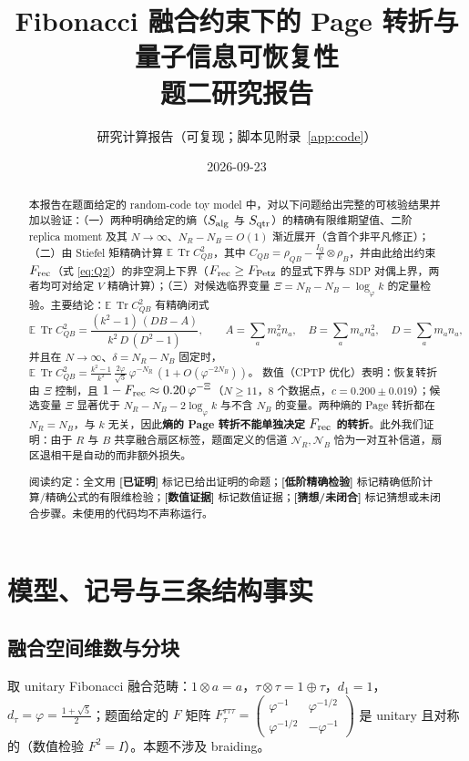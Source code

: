 \documentclass[11pt,a4paper]{ctexart}
\title{\bfseries Fibonacci 融合约束下的 Page 转折与量子信息可恢复性{}\\[4pt] \large 题二研究报告}
\author{研究计算报告（可复现；脚本见附录~\ref{app:code}）}
\date{2026-09-23}
\theoremstyle{definition}
\newcommand{\proved}{\textcolor{green!45!black}{\textbf{[已证明]}}}
\newcommand{\loword}{\textcolor{orange!80!black}{\textbf{[低阶精确检验]}}}
\newcommand{\numeric}{\textcolor{blue!70!black}{\textbf{[数值证据]}}}
\newcommand{\conj}{\textcolor{red!70!black}{\textbf{[猜想/未闭合]}}}
\newcommand{\Tr}{\operatorname{Tr}}
\newcommand{\E}{\mathbb{E}}
\newcommand{\ph}{\varphi}
\newcommand{\Frec}{F_{\rm rec}}
\begin{document}
\maketitle

\begin{abstract}
本报告在题面给定的 random-code toy model 中，对以下问题给出完整的可核验结果并加以验证：（一）两种明确给定的熵（$S_{\rm alg}$ 与 $S_{\rm qtr}$）的精确有限维期望值、二阶 replica moment 及其 $N\to\infty$、$N_R-N_B=O(1)$ 渐近展开（含首个非平凡修正）；（二）由 Stiefel 矩精确计算 $\E\,\Tr C_{QB}^2$，其中 $C_{QB}=\rho_{QB}-\frac{I_Q}{k}\otimes\rho_B$，并由此给出约束 $F_{\rm rec}$（式 \eqref{eq:Q2}）的非空洞上下界（$F_{\rm rec}\ge F_{\rm Petz}$ 的显式下界与 SDP 对偶上界，两者均可对给定 $V$ 精确计算）；（三）对候选临界变量 $\Xi=N_R-N_B-\log_{\ph}k$ 的定量检验。主要结论：$\E\,\Tr C_{QB}^2$ 有精确闭式
\[
\E\,\Tr C_{QB}^2=\frac{(k^2-1)\,(D B-A)}{k^2\,D\,(D^2-1)},\qquad
A=\sum_a m_a^2n_a,\quad B=\sum_a m_an_a^2,\quad D=\sum_a m_an_a,
\]
并且在 $N\to\infty$、$\delta=N_R-N_B$ 固定时，
$\E\,\Tr C_{QB}^2=\frac{k^2-1}{k^2}\,\frac{2\ph}{\sqrt5}\,\ph^{-N_R}\,(1+O(\ph^{-2N_B}))$。
数值（CPTP 优化）表明：恢复转折由 $\Xi$ 控制，且 $1-\Frec\approx 0.20\,\ph^{-\Xi}$（$N\ge11$，8 个数据点，$c=0.200\pm0.019$）；候选变量 $\Xi$ 显著优于 $N_R-N_B-2\log_\ph k$ 与不含 $N_B$ 的变量。两种熵的 Page 转折都在 $N_R=N_B$，与 $k$ 无关，因此\textbf{熵的 Page 转折不能单独决定 $F_{\rm rec}$ 的转折}。此外我们证明：由于 $R$ 与 $B$ 共享融合扇区标签，题面定义的信道 $\mathcal N_R,\mathcal N_B$ 恰为一对互补信道，扇区退相干是自动的而非额外损失。

\medskip
\noindent 阅读约定：全文用 \proved{} 标记已给出证明的命题；\loword{} 标记精确低阶计算/精确公式的有限维检验；\numeric{} 标记数值证据；\conj{} 标记猜想或未闭合步骤。未使用的代码均不声称运行。
\end{abstract}

\tableofcontents

\section{模型、记号与三条结构事实}
\label{sec:setup}

\subsection{融合空间维数与分块}

取 unitary Fibonacci 融合范畴：$1\otimes a=a$，$\tau\otimes\tau=1\oplus\tau$，$d_1=1$，$d_\tau=\ph=\frac{1+\sqrt5}{2}$；题面给定的 $F$ 矩阵
$F^{\tau\tau\tau}_\tau=\begin{pmatrix}\ph^{-1}&\ph^{-1/2}\\ \ph^{-1/2}&-\ph^{-1}\end{pmatrix}$
是 unitary 且对称的（数值检验 $F^2=I$）。本题不涉及 braiding。
\end{document}
